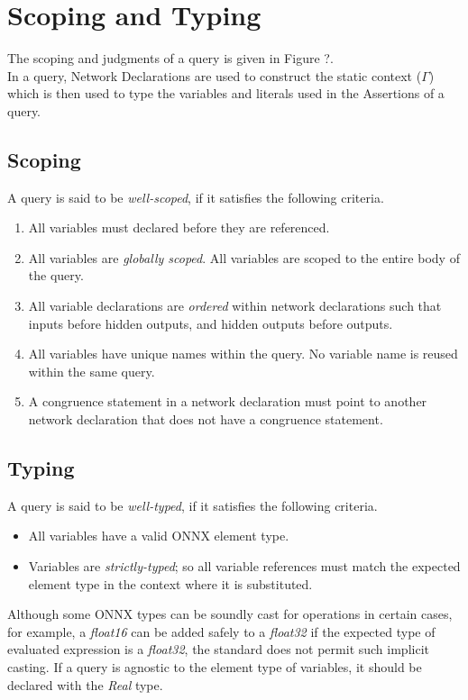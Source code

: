 \section{Scoping and Typing}
\label{sec:scoping_and_typing}
The scoping and judgments of a \vnnlib{} query is given in  Figure ?. \\
In a \vnnlib{} query, Network Declarations are used to construct the static context ($\Gamma$) which is then used to type the variables and literals used in the Assertions of a query.


\subsection{Scoping}
A \vnnlib{} query is said to be \textit{well-scoped}, if it satisfies the following criteria.
\begin{enumerate}
    \item All variables must declared before they are referenced.
    \item All variables are \textit{globally scoped}. All variables are scoped to the entire body of the query.
    \item All variable declarations are \textit{ordered} within network declarations such that inputs before hidden outputs, and hidden outputs before outputs.
    \item All variables have unique names within the query. No variable name is reused within the same query.
    \item A congruence statement in a network declaration must point to another network declaration that does not have a congruence statement.
\end{enumerate}

\subsection{Typing}
A \vnnlib{} query is said to be \textit{well-typed}, if it satisfies the following criteria.

\begin{itemize}
    \item All variables have a valid ONNX element type.
    \item Variables are \textit{strictly-typed}; so all variable references must match the expected element type in the context where it is substituted.
\end{itemize}

Although some ONNX types can be soundly cast for operations in certain cases, for example, a \textit{float16} can be added safely to a \textit{float32} if the expected type of evaluated expression is a \textit{float32}, the \vnnlib{} standard does not permit such implicit casting.
If a query is agnostic to the element type of variables, it should be declared with the \textit{Real} type.


